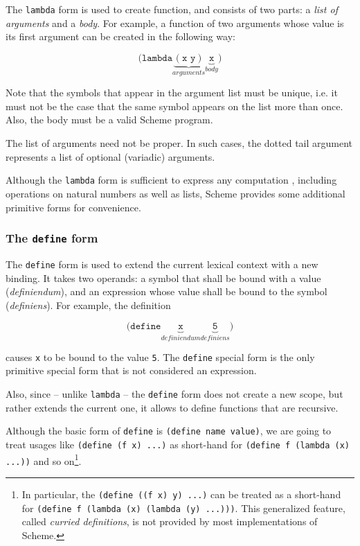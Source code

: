 The \texttt{lambda} form is used to create function, and consists
of two parts: a \textit{list of arguments} and a \textit{body}.
For example, a function of two arguments whose value
is its first argument can be created in the following way:

\begin{equation*}
  \mathtt{(lambda}
  \underbrace{\mathtt{(x\,\,y)}}_{arguments}
  \underbrace{\mathtt{x}}_{body}
  \mathtt{)}
\end{equation*}

Note that the symbols that appear in the argument list must be unique,
i.e. it must not be the case that the same symbol appears on the list
more than once. Also, the body must be a valid Scheme program.

The list of arguments need not be proper. In such cases, the
dotted tail argument represents a list of optional (variadic)
arguments.

Although the \texttt{lambda} form is sufficient to express
any computation \cite{Harrison1997}, including operations
on natural numbers as well as lists\cite{SICP}, Scheme provides
some additional primitive forms for convenience.

\subsubsection{The \texttt{define} form}

The \texttt{define} form is used to extend the current lexical context
with a new binding. It takes two operands:
a symbol that shall be bound with a value (\textit{definiendum}),
and an expression whose value shall be bound to the symbol
(\textit{definiens}). For example, the definition

\begin{equation*}
  \mathtt{(define}
  \underbrace{\mathtt{x}}_{definiendum}
  \underbrace{\mathtt{5}}_{definiens}
  \mathtt{)}
\end{equation*}

causes \texttt{x} to be bound to the value \texttt{5}.
The \texttt{define} special form is the only primitive special form
that is not considered an expression.

Also, since -- unlike \texttt{lambda} -- the \texttt{define} form
does not create a new scope, but rather extends the current one,
it allows to define functions that are recursive.

Although the basic form of \texttt{define} is \texttt{(define name value)},
we are going to treat usages like \texttt{(define (f x) ...)} as short-hand
for \texttt{(define f (lambda (x) ...))} and so on\footnote{In particular,
  the \texttt{(define ((f x) y) ...)} can be treated as a short-hand for
  \texttt{(define f (lambda (x) (lambda (y) ...)))}. This generalized
  feature, called \textit{curried definitions}, is not provided by most
  implementations of Scheme.}.

